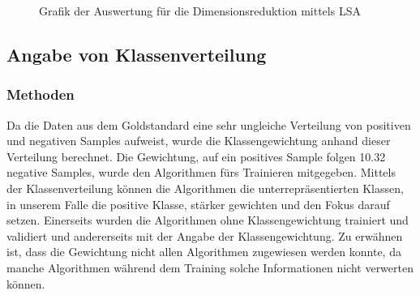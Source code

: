 \begin{figure}[H]
	\setlength{\fboxsep}{0.3pt} 
	\setlength{\fboxrule}{0.3pt} 
	\caption{Grafik der Auswertung für die Dimensionsreduktion mittels LSA}
	\label{abb:dimred}
\end{figure}
\subsection{Angabe von Klassenverteilung}
\subsubsection{Methoden}
Da die Daten aus dem Goldstandard eine sehr ungleiche Verteilung von positiven und negativen Samples aufweist, wurde die Klassengewichtung anhand dieser Verteilung berechnet.
Die Gewichtung, auf ein positives Sample folgen 10.32 negative Samples, wurde den Algorithmen fürs Trainieren mitgegeben.
Mittels der Klassenverteilung können die Algorithmen die unterrepräsentierten Klassen, in unserem Falle die positive Klasse, stärker gewichten und den Fokus darauf setzen.
Einerseits wurden die Algorithmen ohne Klassengewichtung trainiert und validiert und andererseits mit der Angabe der Klassengewichtung.
Zu erwähnen ist, dass die Gewichtung nicht allen Algorithmen zugewiesen werden konnte, da manche Algorithmen während dem Training solche Informationen nicht verwerten können.
